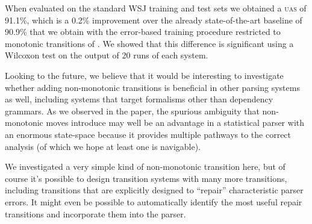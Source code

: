 \documentclass[11pt,letterpaper]{article}
\newcommand{\uas}{\textsc{uas}\xspace}
\begin{document}
When evaluated on the standard WSJ training and test sets we obtained a \uas of 91.1\%,
which is a 0.2\% improvement over the already state-of-the-art baseline of 90.9\% that we
obtain with the error-based training procedure restricted to monotonic transitions of
\citet{goldberg:12}.  We showed that this difference is significant using a Wilcoxon
test on the output of 20 runs of each system.

Looking to the future, we believe that it would be interesting to investigate whether
adding non-monotonic transitions is beneficial in other parsing systems as well, including
systems that target formalisms other than dependency grammars.  As we observed
in the paper, the spurious ambiguity that non-monotonic moves introduce may well be an
advantage in a statistical parser with an enormous state-space because it provides
multiple pathways to the correct analysis (of which we hope at least one is navigable).

We investigated a very simple kind of non-monotonic transition here, but of course it's
possible to design transition systems with many more transitions, including transitions
that are explicitly designed to ``repair'' characteristic parser errors.  It might even
be possible to automatically identify the most useful repair transitions and incorporate them
into the parser.



\end{document}
